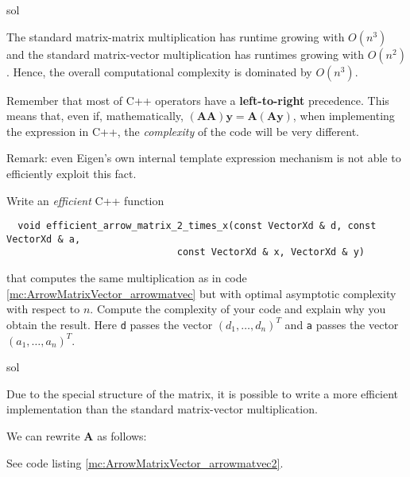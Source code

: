\begin{samproblem}
\begin{subproblem}
 \begin{samwriteprbpart}{sol}
\begin{samsolution}
  The standard matrix-matrix multiplication has runtime growing with $O(n^3)$ and the standard
  matrix-vector multiplication has runtimes growing with $O(n^2)$. Hence, the overall
  computational complexity is dominated by $O(n^3)$.

  Remember that most of C++ operators have a \textbf{left-to-right} precedence. This means that,
  even if,
  mathematically, $(\mathbf{A} \mathbf{A}) \mathbf{y} = \mathbf{A} (\mathbf{A} \mathbf{y})$, when
  implementing the expression in C++, the \emph{complexity} of the code will be very different.

  Remark: even Eigen's own internal template expression mechanism is not able to efficiently
  exploit this fact.
\end{samsolution}
\end{samwriteprbpart}
\end{subproblem}

\begin{subproblem}
Write an \emph{efficient} C++ function
\begin{verbatim}
  void efficient_arrow_matrix_2_times_x(const VectorXd & d, const VectorXd & a,
                              const VectorXd & x, VectorXd & y)
\end{verbatim}
that computes the same multiplication as in code \ref{mc:ArrowMatrixVector_arrowmatvec} but
with optimal asymptotic complexity with respect to {$n$}. Compute the complexity of your code and explain why you obtain the result.
Here \texttt{d} passes the vector $(d_{1},\ldots,d_{n})^{T}$ and \texttt{a} passes the
vector $(a_{1},\ldots,a_{n})^{T}$.
 \begin{samwriteprbpart}{sol}
\begin{samsolution}
  Due to the special structure of the matrix, it is possible to write a more efficient
  implementation than the standard matrix-vector multiplication.

  We can rewrite $\mathbf{A}$ as follows:


  See code listing \ref{mc:ArrowMatrixVector_arrowmatvec2}.
\vspace{0.5cm}

% 
\end{samsolution}
\end{samwriteprbpart}
\end{subproblem}


\end{samproblem}

